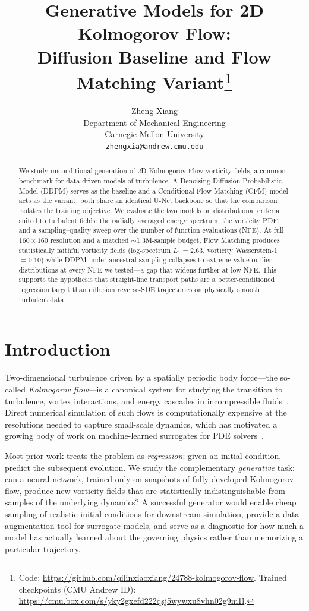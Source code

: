 \documentclass{article}
\title{Generative Models for 2D Kolmogorov Flow:\\
Diffusion Baseline and Flow Matching Variant\thanks{Code:
\url{https://github.com/qilinxiaoxiang/24788-kolmogorov-flow}.
Trained checkpoints (CMU Andrew ID):
\url{https://cmu.box.com/s/yky2gxefd222qsj5wywxu8vhn02g9m1l}.}}
\author{
  Zheng Xiang \\
  Department of Mechanical Engineering \\
  Carnegie Mellon University \\
  \texttt{zhengxia@andrew.cmu.edu}
}
\begin{document}
\maketitle

\begin{abstract}
We study unconditional generation of 2D Kolmogorov Flow vorticity fields, a
common benchmark for data-driven models of turbulence. A Denoising Diffusion
Probabilistic Model (DDPM) serves as the baseline and a Conditional Flow
Matching (CFM) model acts as the variant; both share an identical U-Net
backbone so that the comparison isolates the training objective. We evaluate
the two models on distributional criteria suited to turbulent fields: the
radially averaged energy spectrum, the vorticity PDF, and a sampling--quality
sweep over the number of function evaluations (NFE). At full $160{\times}160$
resolution and a matched $\sim$1.3M-sample budget, Flow Matching produces
statistically faithful vorticity fields (log-spectrum $L_1=2.63$,
vorticity Wasserstein-1 $=0.10$) while DDPM under ancestral sampling
collapses to extreme-value outlier distributions at every NFE we tested---a
gap that widens further at low NFE. This supports the hypothesis that
straight-line transport paths are a better-conditioned regression target
than diffusion reverse-SDE trajectories on physically smooth turbulent
data.
\end{abstract}

\section{Introduction}

Two-dimensional turbulence driven by a spatially periodic body force---the
so-called \emph{Kolmogorov flow}---is a canonical system for studying the
transition to turbulence, vortex interactions, and energy cascades in
incompressible fluids~\cite{boffetta2012kolmogorov}. Direct numerical
simulation of such flows is computationally expensive at the resolutions
needed to capture small-scale dynamics, which has motivated a growing body of
work on machine-learned surrogates for PDE
solvers~\cite{li2021fno,kochkov2021ml}.

Most prior work treats the problem as \emph{regression}: given an initial
condition, predict the subsequent evolution. We study the complementary
\emph{generative} task: can a neural network, trained only on snapshots of
fully developed Kolmogorov flow, produce new vorticity fields that are
statistically indistinguishable from samples of the underlying dynamics? A
successful generator would enable cheap sampling of realistic initial
conditions for downstream simulation, provide a data-augmentation tool for
surrogate models, and serve as a diagnostic for how much a model has actually
learned about the governing physics rather than memorizing a particular
trajectory.
\end{document}

